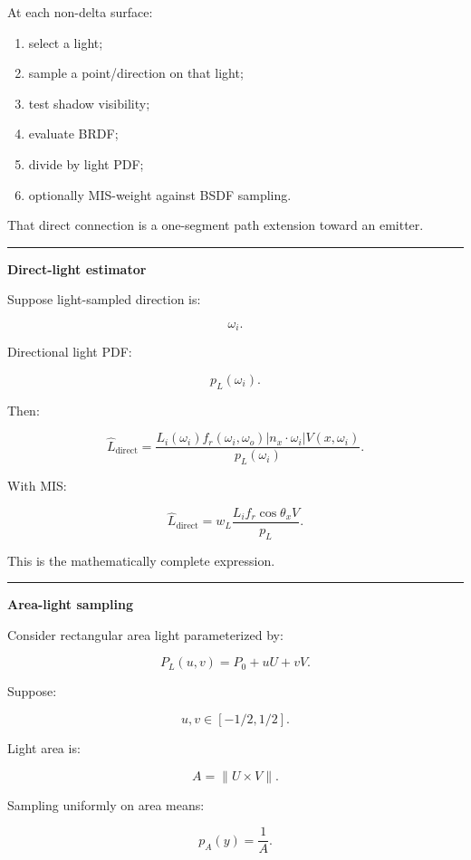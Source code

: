 At each non-delta surface:

\begin{enumerate}
\def\labelenumi{\arabic{enumi}.}
\tightlist
\item
  select a light;
\item
  sample a point/direction on that light;
\item
  test shadow visibility;
\item
  evaluate BRDF;
\item
  divide by light PDF;
\item
  optionally MIS-weight against BSDF sampling.
\end{enumerate}

That direct connection is a one-segment path extension toward an emitter.

\begin{center}\rule{0.5\linewidth}{0.5pt}\end{center}

\textbf{Direct-light estimator}

Suppose light-sampled direction is:

\[
\omega_i.
\]

Directional light PDF:

\[
p_L(\omega_i).
\]

Then:

\[
\boxed{
\hat L_{\text{direct}}
=
\frac{
L_i(\omega_i)
f_r(\omega_i,\omega_o)
|n_x\cdot\omega_i|
V(x,\omega_i)
}{
p_L(\omega_i)
}.
}
\]

With MIS:

\[
\boxed{
\hat L_{\text{direct}}
=
w_L
\frac{
L_i f_r\cos\theta_xV
}{
p_L
}.
}
\]

This is the mathematically complete expression.

\begin{center}\rule{0.5\linewidth}{0.5pt}\end{center}

\textbf{Area-light sampling}

Consider rectangular area light parameterized by:

\[
P_L(u,v)
=
P_0+
uU+
vV.
\]

Suppose:

\[
u,v\in[-1/2,1/2].
\]

Light area is:

\[
\boxed{
A=
\|U\times V\|.
}
\]

Sampling uniformly on area means:

\[
p_A(y)
=
\frac1A.
\]

